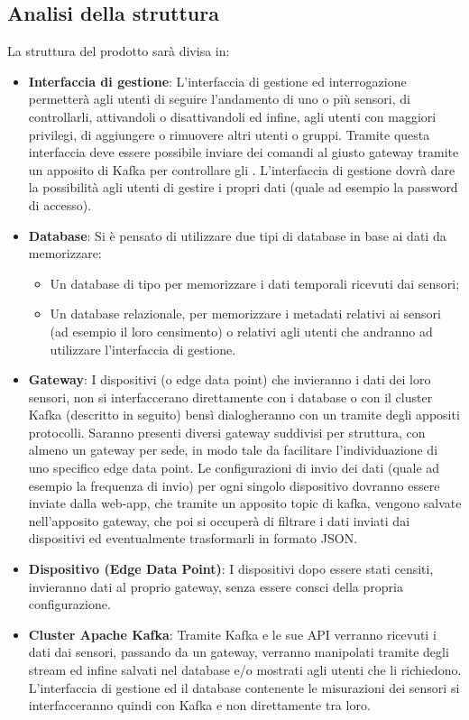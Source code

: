 	\subsection{Analisi della struttura}
		La struttura del prodotto sarà divisa in:
		\begin{itemize}
			\item \textbf{Interfaccia di gestione}: L'interfaccia di gestione ed interrogazione permetterà agli utenti di seguire l'andamento di uno o più sensori, di controllarli, attivandoli o disattivandoli ed infine, agli utenti con maggiori privilegi, di aggiungere o rimuovere altri utenti o gruppi.
			Tramite questa interfaccia deve essere possibile inviare dei comandi al giusto gateway tramite un apposito  di Kafka per controllare gli . 
			L'interfaccia di gestione dovrà dare la possibilità agli utenti di gestire i propri dati (quale ad esempio la password di accesso).
			\item \textbf{Database}: Si è pensato di utilizzare due tipi di database in base ai dati da memorizzare:
			\begin{itemize}
				\item Un database di tipo  per memorizzare i dati temporali ricevuti dai sensori;
				\item Un database relazionale, per memorizzare i metadati relativi ai sensori (ad esempio il loro censimento) o relativi agli utenti che andranno ad utilizzare l'interfaccia di gestione.
			\end{itemize}

			\item \textbf{Gateway}: I dispositivi (o edge data point) che invieranno i dati dei loro sensori, non si interfaccerano direttamente con i database o con il cluster Kafka (descritto in seguito) bensì dialogheranno con un  tramite degli appositi protocolli.
			Saranno presenti diversi gateway suddivisi per struttura, con almeno un gateway per sede, in modo tale da facilitare l'individuazione di uno specifico edge data point.
			Le configurazioni di invio dei dati (quale ad esempio la frequenza di invio) per ogni singolo dispositivo dovranno essere inviate dalla web-app, che tramite un apposito topic di kafka, vengono salvate nell'apposito gateway, che poi si occuperà di filtrare i dati inviati dai dispositivi ed eventualmente trasformarli in formato JSON. 

			\item \textbf{Dispositivo (Edge Data Point)}: I dispositivi dopo essere stati censiti, invieranno dati al proprio gateway, senza essere consci della propria configurazione.

			\item \textbf{Cluster Apache Kafka}: Tramite Kafka e le sue API verranno ricevuti i dati dai sensori, passando da un gateway, verranno manipolati tramite degli stream ed infine salvati nel database e/o mostrati agli utenti che li richiedono. L'interfaccia di gestione ed il database contenente le misurazioni dei sensori si interfacceranno quindi con Kafka e non direttamente tra loro.

		\end{itemize}
